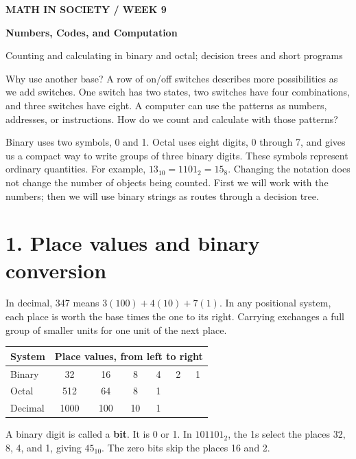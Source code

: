 \documentclass[10pt]{article}
\newcommand{\sect}[1]{\medskip\section*{\color{olive}#1}\vspace{-5pt}}
\begin{document}
{\small\bfseries\color{teal}MATH IN SOCIETY / WEEK 9}\par\vspace{6pt}
{\fontsize{27}{30}\selectfont\bfseries\color{olive}Numbers, Codes, and Computation}\par\vspace{5pt}
{\large Counting and calculating in binary and octal; decision trees and short programs}\par\vspace{10pt}
\begin{worked}{Why use another base?}
A row of on/off switches describes more possibilities as we add switches. One switch has two states, two switches have four combinations, and three switches have eight. A computer can use the patterns as numbers, addresses, or instructions. How do we count and calculate with those patterns?
\end{worked}
Binary uses two symbols, 0 and 1. Octal uses eight digits, 0 through 7, and gives us a compact way to write groups of three binary digits. These symbols represent ordinary quantities. For example, $13_{10}=1101_2=15_8$. Changing the notation does not change the number of objects being counted. First we will work with the numbers; then we will use binary strings as routes through a decision tree.

\sect{1. Place values and binary conversion}
In decimal, 347 means $3(100)+4(10)+7(1)$. In any positional system, each place is worth the base times the one to its right. Carrying exchanges a full group of smaller units for one unit of the next place.

\begin{center}\begin{tabular}{lcccccc}\toprule
System & \multicolumn{6}{c}{Place values, from left to right}\\\midrule
Binary &32&16&8&4&2&1\\
Octal &512&64&8&1&&\\
Decimal &1000&100&10&1&&\\\bottomrule
\end{tabular}\end{center}
A binary digit is called a \textbf{bit}. It is 0 or 1. In $101101_2$, the 1s select the places 32, 8, 4, and 1, giving $45_{10}$. The zero bits skip the places 16 and 2.
\end{document}
